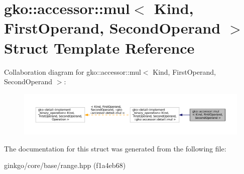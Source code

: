\hypertarget{structgko_1_1accessor_1_1mul}{}\section{gko\+:\+:accessor\+:\+:mul$<$ Kind, First\+Operand, Second\+Operand $>$ Struct Template Reference}
\label{structgko_1_1accessor_1_1mul}


Collaboration diagram for gko\+:\+:accessor\+:\+:mul$<$ Kind, First\+Operand, Second\+Operand $>$\+:
\nopagebreak
\begin{figure}[H]
\begin{center}
\leavevmode
\includegraphics[width=350pt]{structgko_1_1accessor_1_1mul__coll__graph}
\end{center}
\end{figure}


The documentation for this struct was generated from the following file\+:\begin{DoxyCompactItemize}
\item 
ginkgo/core/base/range.\+hpp (f1a4eb68)\end{DoxyCompactItemize}
